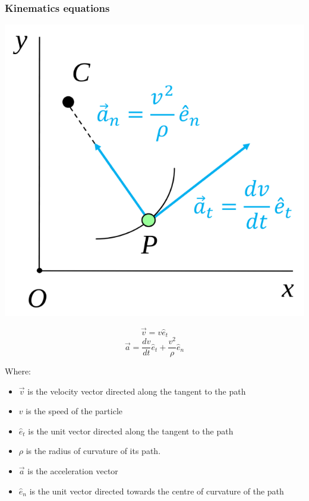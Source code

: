 \documentclass[11pt]{article}
\begin{document}
\subsubsection{Kinematics equations}
\label{sec:orgb1368cb}
\begin{center}
\includegraphics[width=.9\linewidth]{./images/path-coordinates-kinematics-equations.png}
\end{center}
\[\vec{v} = v \hat{e}_t\]
\[\vec{a} = \frac{dv}{dt} \hat{e}_t + \frac{v^2}{\rho} \hat{e}_n\]

Where:
\begin{itemize}
\item \(\vec{v}\) is the velocity vector directed along the tangent to the path
\item \(v\) is the speed of the particle
\item \(\hat{e}_t\) is the unit vector directed along the tangent to the path
\item \(\rho\) is the radius of curvature of its path.
\item \(\vec{a}\) is the acceleration vector
\item \(\hat{e}_n\) is the unit vector directed towards the centre of curvature of the path
\end{itemize}
\end{document}

